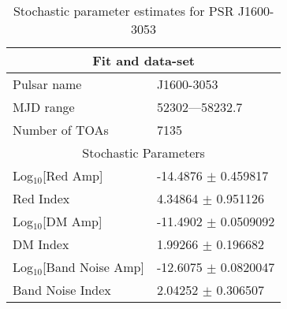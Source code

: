 \documentclass{article}
\begin{document}
\begin{table*}
\caption{Stochastic parameter estimates for PSR J1600-3053}
\begin{tabular}{ll}
\hline\hline
\multicolumn{2}{c}{Fit and data-set} \\ 
\hline
Pulsar name\dotfill & J1600-3053 \\ 
MJD range\dotfill & 52302---58232.7 \\ 
Number of TOAs\dotfill & 7135 \\
\hline
\multicolumn{2}{c}{Stochastic Parameters} \\ 
\hline
Log$_{10}$[Red Amp] \dotfill & -14.4876 $\pm$ 0.459817  \\ 
Red Index \dotfill & 4.34864 $\pm$ 0.951126  \\ 
Log$_{10}$[DM Amp] \dotfill & -11.4902 $\pm$ 0.0509092  \\ 
DM Index \dotfill & 1.99266 $\pm$ 0.196682  \\ 
Log$_{10}$[Band Noise Amp] \dotfill & -12.6075 $\pm$ 0.0820047  \\ 
Band Noise Index \dotfill & 2.04252 $\pm$ 0.306507  \\ 
\hline
\end{tabular}
\label{Table:J1600-3053}
\end{table*} 
\end{document}
